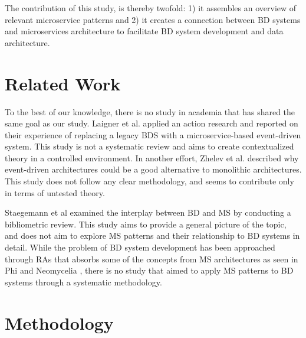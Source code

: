 \documentclass{bmcart}
\begin{document}

The contribution of this study, is thereby twofold: 1) it assembles an overview of relevant microservice patterns and 2) it creates a connection between BD systems and microservices architecture to facilitate BD system development and data architecture.


\section{Related Work}

To the best of our knowledge, there is no study in academia that has shared the same goal as our study. Laigner et al. \cite{laigner2020monolithic} applied an action research and reported on their experience of replacing a legacy BDS with a microservice-based event-driven system. This study is not a systematic review and aims to create contextualized theory in a controlled environment. In another effort,  Zhelev et al. \cite{zhelev2019using} described why event-driven architectures could be a good alternative to monolithic architectures. This study does not follow any clear methodology, and seems to contribute only in terms of untested theory.

Staegemann et al \cite{staegemann2021examining} examined the interplay between BD and MS by conducting a bibliometric review. This study aims to provide a general picture of the topic, and does not aim to explore MS patterns and their relationship to BD systems in detail.  While the problem of BD system development has been approached through RAs that absorbs some of the concepts from MS architectures as seen in Phi \cite{Phi} and Neomycelia \cite{ataei2021neomycelia}, there is no study that aimed to apply MS patterns to BD systems through a systematic methodology.


\section{Methodology}
\end{document}
